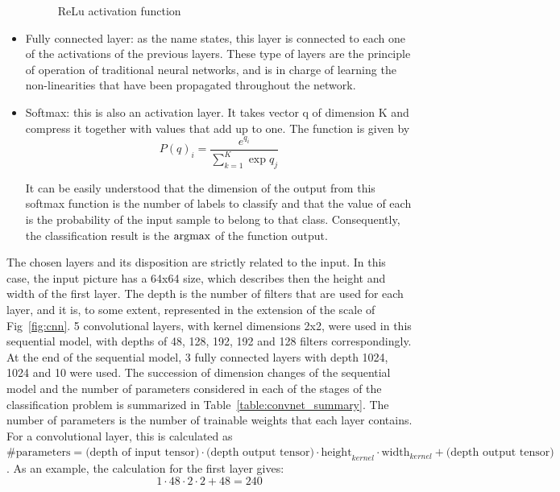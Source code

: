 \begin{itemize}
\begin{figure}[!htb]
              \caption{ReLu activation function}
              \label{fig:maxpool}
        \end{figure}
    \item Fully connected layer: as the name states, this layer is connected to each one of the activations of the previous layers. These type of layers are the principle of operation of traditional neural networks, and is in charge of learning the non-linearities that have been propagated throughout the network.
    \item Softmax: this is also an activation layer. It takes vector q of dimension K and compress it together with values that add up to one. The function is given by
        \begin{equation}
            P(q)_i = \frac{e^{q_i}}{\sum_{k=1}^{K} \exp{q_j}}
        \end{equation}

        It can be easily understood that the dimension of the output from this softmax function is the number of labels to classify and that the value of each is the probability of the input sample to belong to that class. Consequently, the classification result is the \( \operatorname*{\arg\!\max} \) of the function output.
\end{itemize}

The chosen layers and its disposition are strictly related to the input. In this case, the input picture has a 64x64 size, which describes then the height and width of the first layer. The depth is the number of filters that are used for each layer, and it is, to some extent, represented in the extension of the scale of Fig~\ref{fig:cnn}. 5 convolutional layers, with kernel dimensions 2x2, were used in this sequential model, with depths of 48, 128, 192, 192 and 128 filters correspondingly. At the end of the sequential model, 3 fully connected layers with depth 1024, 1024 and 10 were used. The succession of dimension changes of the sequential model and the number of parameters considered in each of the stages of the classification problem is summarized in Table~\ref{table:convnet_summary}. The number of parameters is the number of trainable weights that each layer contains. For a convolutional layer, this is calculated as \( \text{\# parameters} = \text{(depth of input tensor)}\cdot\text{(depth output tensor)}\cdot\text{height}_{kernel}\cdot \text{width}_{kernel} + \text{(depth output tensor)} \). As an example, the calculation for the first layer gives:
\begin{equation*}
    1 \cdot 48 \cdot 2 \cdot 2 + 48 = 240
\end{equation*}

